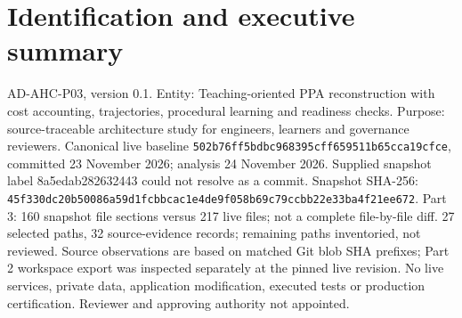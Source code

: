 \documentclass[10pt,letterpaper]{article}
\begin{document}
\makedoctitle
\tableofcontents
\listoffigures
\listoftables
\clearpage
\section{Identification and executive summary}
AD-AHC-P03, version 0.1. Entity: Teaching-oriented PPA reconstruction with cost accounting, trajectories, procedural learning and readiness checks. Purpose: source-traceable architecture study for engineers, learners and governance reviewers. Canonical live baseline \nolinkurl{502b76ff5bdbc968395cff659511b65cca19cfce}, committed 23 November 2026; analysis 24 November 2026. Supplied snapshot label 8a5edab282632443 could not resolve as a commit. Snapshot SHA-256: \nolinkurl{45f330dc20b50086a59d1fcbbcac1e4de9f058b69c79ccbb22e33ba4f21ee672}. Part 3: 160 snapshot file sections versus 217 live files; not a complete file-by-file diff. 27 selected paths, 32 source-evidence records; remaining paths inventoried, not reviewed. Source observations are based on matched Git blob SHA prefixes; Part 2 workspace export was inspected separately at the pinned live revision. No live services, private data, application modification, executed tests or production certification. Reviewer and approving authority not appointed.
\end{document}

